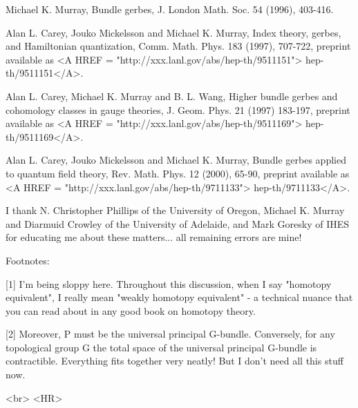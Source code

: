 Michael K. Murray, Bundle gerbes, J. London Math. Soc. 54 (1996), 403-416.

Alan L. Carey, Jouko Mickelsson and Michael K. Murray, Index theory,
gerbes, and Hamiltonian quantization, Comm. Math. Phys. 183 (1997), 707-722,
preprint available as <A HREF = "http://xxx.lanl.gov/abs/hep-th/9511151">
hep-th/9511151</A>.

Alan L. Carey, Michael K. Murray and B. L. Wang, Higher bundle gerbes and 
cohomology classes in gauge theories, J. Geom. Phys. 21 (1997) 183-197,
preprint available as <A HREF = "http://xxx.lanl.gov/abs/hep-th/9511169">
hep-th/9511169</A>.

Alan L. Carey, Jouko Mickelsson and Michael K. Murray, Bundle gerbes
applied to quantum field theory, Rev. Math. Phys. 12 (2000), 65-90,
preprint available as <A HREF = "http://xxx.lanl.gov/abs/hep-th/9711133">
hep-th/9711133</A>.

I thank N. Christopher Phillips of the University of Oregon, 
Michael K. Murray and Diarmuid Crowley of the University of 
Adelaide, and Mark Goresky of IHES for educating me about these
matters... all remaining errors are mine!

Footnotes: 

[1] 
I'm being sloppy here.  Throughout this discussion, when
I say "homotopy equivalent",
I really mean "weakly homotopy equivalent" - a technical
nuance that you can read about in any good book on homotopy theory.

[2] Moreover, P must be the universal principal G-bundle. Conversely,
for any topological group G the total space of the universal principal
G-bundle is contractible.    Everything fits together very neatly!  But
I don't need all this stuff now.




<br>
<HR>



